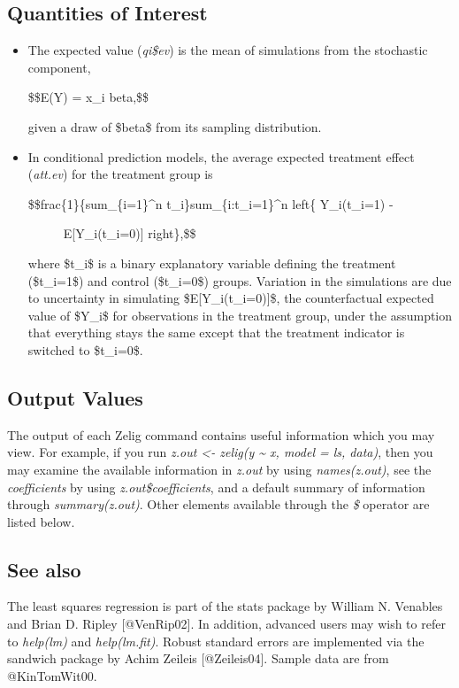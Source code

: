 \documentclass[letterpaper,10pt,english]{sphinxmanual}
\begin{document}
\subsection{Quantities of Interest}
\label{vignette:quantities-of-interest}\begin{itemize}
\item {} 
The expected value (\emph{qi\$ev}) is the mean of simulations
from the stochastic component,

\$\$E(Y) = x\_i beta,\$\$

given a draw of \$beta\$ from its sampling distribution.

\item {} 
In conditional prediction models, the average expected treatment
effect (\emph{att.ev}) for the treatment group is
\begin{description}
\item[{\$\$frac\{1\}\{sum\_\{i=1\}\textasciicircum{}n t\_i\}sum\_\{i:t\_i=1\}\textasciicircum{}n left\{ Y\_i(t\_i=1) -}] \leavevmode
E{[}Y\_i(t\_i=0){]} right\},\$\$

\end{description}

where \$t\_i\$ is a binary explanatory variable defining the treatment
(\$t\_i=1\$) and control (\$t\_i=0\$) groups. Variation in the simulations
are due to uncertainty in simulating \$E{[}Y\_i(t\_i=0){]}\$, the
counterfactual expected value of \$Y\_i\$ for observations in the
treatment group, under the assumption that everything stays the same
except that the treatment indicator is switched to \$t\_i=0\$.

\end{itemize}


\subsection{Output Values}
\label{vignette:output-values}
The output of each Zelig command contains useful information which you
may view. For example, if you run
\emph{z.out \textless{}- zelig(y \textasciitilde{} x, model = ls, data)}, then you may examine the
available information in \emph{z.out} by using \emph{names(z.out)}, see the
\emph{coefficients} by using \emph{z.out\$coefficients}, and
a default summary of information through \emph{summary(z.out)}. Other
elements available through the \emph{\$} operator are listed
below.


\subsection{See also}
\label{vignette:see-also}
The least squares regression is part of the stats package by William N.
Venables and Brian D. Ripley {[}@VenRip02{]}. In addition, advanced users may
wish to refer to \emph{help(lm)} and \emph{help(lm.fit)}. Robust standard errors
are implemented via the sandwich package by Achim Zeileis
{[}@Zeileis04{]}. Sample data are from @KinTomWit00.



\renewcommand{\indexname}{Index}
\printindex
\end{document}
